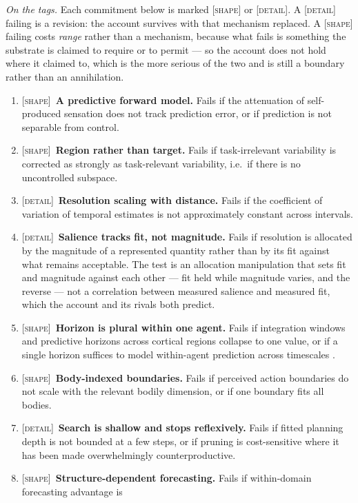 \documentclass[11pt,a4paper]{article}
\theoremstyle{remark}
\begin{document}
\noindent\emph{On the tags.} Each commitment below is marked \textsc{[shape]} or \textsc{[detail]}.
A \textsc{[detail]} failing is a revision: the account survives with that mechanism replaced. A
\textsc{[shape]} failing costs \emph{range} rather than a mechanism, because what fails is something
the substrate is claimed to require or to permit --- so the account does not hold where it claimed to,
which is the more serious of the two and is still a boundary rather than an annihilation.
\begin{enumerate}[leftmargin=*]
\item \textsc{[shape]}~\textbf{A predictive forward model.} Fails if the attenuation of self-produced sensation does
not track prediction error, or if prediction is not separable from control.
\item \textsc{[shape]}~\textbf{Region rather than target.} Fails if task-irrelevant variability is corrected as
strongly as task-relevant variability, i.e.\ if there is no uncontrolled subspace.
\item \textsc{[detail]}~\textbf{Resolution scaling with distance.} Fails if the coefficient of variation of temporal
estimates is not approximately constant across intervals.
\item \textsc{[detail]}~\textbf{Salience tracks fit, not magnitude.} Fails if resolution is allocated by the
magnitude of a represented quantity rather than by its fit against what remains acceptable. The test
is an allocation manipulation that sets fit and magnitude against each other --- fit held while
magnitude varies, and the reverse --- not a correlation between measured salience and measured fit,
which the account and its rivals both predict.
\item \textsc{[shape]}~\textbf{Horizon is plural within one agent.} Fails if integration windows and predictive
horizons across cortical regions collapse to one value, or if a single horizon suffices to model
within-agent prediction across timescales \citep{hasson2008,brunec2022}.
\item \textsc{[shape]}~\textbf{Body-indexed boundaries.} Fails if perceived action boundaries do not scale with the
relevant bodily dimension, or if one boundary fits all bodies.
\item \textsc{[detail]}~\textbf{Search is shallow and stops reflexively.} Fails if fitted planning depth is not
bounded at a few steps, or if pruning is cost-sensitive where it has been made overwhelmingly
counterproductive.
\item \textsc{[shape]}~\textbf{Structure-dependent forecasting.} Fails if within-domain forecasting advantage is

\end{enumerate}
\end{document}
